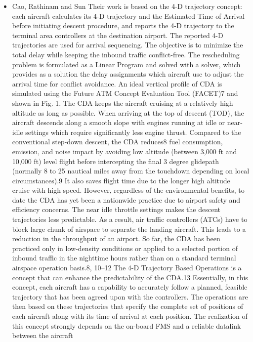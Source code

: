 \documentclass{aer1315-pretty}
\begin{document}
\begin{itemize}
\item Cao, Rathinam and Sun \cite{Cao:2011} 
Their work is based on the 4-D trajectory concept: each aircraft calculates its 4-D trajectory and the Estimated Time of Arrival before initiating descent procedure, and reports the 4-D trajectory to the terminal area controllers at the destination airport. The reported 4-D trajectories are used for arrival sequencing. The objective is to minimize the total delay while keeping the inbound traffic conflict-free. The rescheduling problem is formulated as a Linear Program and solved with a solver, which provides as a solution the delay assignments which aircraft use to adjust the arrival time for conflict avoidance.
    An ideal vertical profile of CDA is simulated using the Future ATM Concept Evaluation Tool (FACET)7
and shown in Fig. 1. The CDA keeps the aircraft cruising at a relatively high altitude as long as possible.
When arriving at the top of descent (TOD), the aircraft descends along a smooth slope with engines running
at idle or near-idle settings which require significantly less engine thrust. Compared to the conventional
step-down descent, the CDA reduces8 fuel consumption, emission, and noise impact by avoiding low altitude
(between 3,000 ft and 10,000 ft) level flight before intercepting the final 3 degree glidepath (normally 8 to
25 nautical miles away from the touchdown depending on local circumstances).9 It also saves flight time
due to the longer high altitude cruise with high speed. However, regardless of the environmental benefits,
to date the CDA has yet been a nationwide practice due to airport safety and efficiency concerns. The near idle throttle settings makes the descent trajectories less predictable. As a result, air traffic controllers
(ATCs) have to block large chunk of airspace to separate the landing aircraft. This leads to a reduction in
the throughput of an airport. So far, the CDA has been practiced only in low-density conditions or applied
to a selected portion of inbound traffic in the nighttime hours rather than on a standard terminal airspace
operation basis.8, 10–12     The 4-D Trajectory Based Operations is a concept that can enhance the predictability of the CDA.13
Essentially, in this concept, each aircraft has a capability to accurately follow a planned, feasible trajectory
that has been agreed upon with the controllers. The operations are then based on these trajectories that
specify the complete set of positions of each aircraft along with its time of arrival at each position. The
realization of this concept strongly depends on the on-board FMS and a reliable datalink between the aircraft

\end{itemize}
\end{document}
